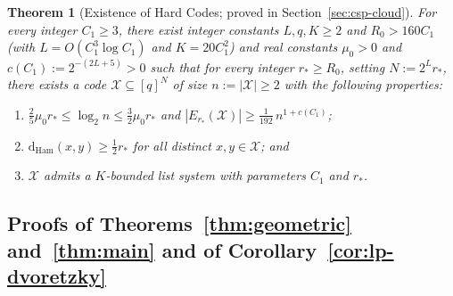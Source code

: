 \documentclass[11pt]{article}
\newtheorem{theorem}{Theorem}[section]
\theoremstyle{definition}
\theoremstyle{remark}
\newcommand{\Ham}{\mathrm{Ham}}
\newcommand{\dHam}{\mathrm{d}_{\Ham}}
\begin{document}
\begin{theorem}[Existence of Hard Codes; proved in Section~\ref{sec:csp-cloud}]
\label{thm:mod3-cloud}
For every integer $C_1 \ge 3$, there exist integer constants $L, q, K \ge 2$ and $R_0 > 160 C_1$ (with $L = O(C_1^3 \log C_1)$ and $K = 20 C_1^2$) and real constants $\mu_0 > 0$ and $c(C_1) := 2^{-(2 L + 5)} > 0$ such that for every integer $r_* \ge R_0$, setting $N := 2^L r_*$, there exists a code $\mathcal{X} \subseteq [q]^N$ of size $n := |\mathcal{X}| \ge 2$ with the following properties:
\begin{enumerate}[label=(\arabic*),nosep]
  \item $\frac{2}{5} \mu_0 r_* \le \log_2 n \le \frac{3}{2} \mu_0 r_*$ and $|E_{r_*}(\mathcal{X})| \ge \frac{1}{192}\,n^{1 + c(C_1)}$;
  \item $\dHam(x, y) \ge \frac{1}{2} r_*$ for all distinct $x, y \in \mathcal{X}$; and
  \item $\mathcal{X}$ admits a $K$-bounded list system with parameters $C_1$ and $r_*$.
\end{enumerate}
\end{theorem}

\subsection{Proofs of Theorems~\ref{thm:geometric} and~\ref{thm:main} and of Corollary~\ref{cor:lp-dvoretzky}}
\label{subsec:master-proof}
\end{document}
